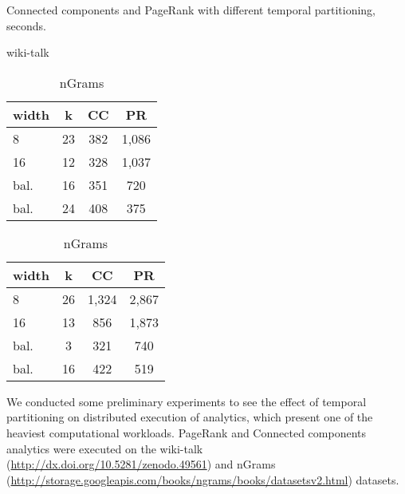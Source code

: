 \begin{table}
\centering
\caption{Connected components and PageRank with different temporal partitioning, seconds.}
\begin{subtable}{0.229\textwidth}
\small
\caption{wiki-talk}
\begin{tabular}{| l | c | c | c |}
\hline
\multicolumn{1}{|l|}{\bfseries width} & \multicolumn{1}{c|}{\bfseries k} & \multicolumn{1}{c|}{\bfseries CC} & \multicolumn{1}{c|}{\bfseries PR} \\ \hline
8 & 23 & 382 & 1,086 \\ \hline
16 & 12 & 328 & 1,037 \\ \hline
bal. & 16 & 351 & 720 \\ \hline
bal. & 24 & 408 & 375 \\ \hline
\end{tabular}
\label{fig:splitwiki}
\end{subtable}
\begin{subtable}{0.229\textwidth}
\small
\caption{nGrams}
\begin{tabular}{| l | c | c | c |}
\hline
\multicolumn{1}{|l|}{\bfseries width} & \multicolumn{1}{c|}{\bfseries k} & \multicolumn{1}{c|}{\bfseries CC} & \multicolumn{1}{c|}{\bfseries PR} \\ \hline
8 & 26 & 1,324 & 2,867 \\ \hline
16 & 13 & 856 & 1,873  \\ \hline
bal. & 3 & 321 & 740  \\ \hline
bal. & 16 & 422 & 519 \\ \hline
\end{tabular}
\label{fig:splitngrams}
\end{subtable}
\label{tab:splitres}
\end{table}


We conducted some preliminary experiments to see the effect of
temporal partitioning on distributed execution of analytics, which
present one of the heaviest computational workloads.  PageRank and
Connected components analytics were executed on the wiki-talk
(\url{http://dx.doi.org/10.5281/zenodo.49561}) and nGrams
(\url{http://storage.googleapis.com/books/ngrams/books/datasetsv2.html})
datasets.

